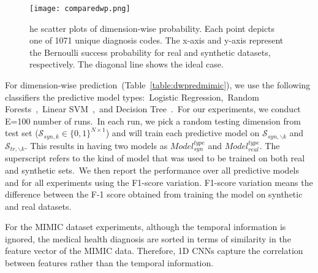\documentclass[letterpaper]{article} \usepackage{aaai20}  \usepackage{times}  \usepackage{helvet} \usepackage{courier}  \usepackage[hyphens]{url}  \usepackage{graphicx} \urlstyle{rm} \def\UrlFont{\rm}  \usepackage{graphicx}  \frenchspacing  \setlength{\pdfpagewidth}{8.5in}  \setlength{\pdfpageheight}{11in}
\begin{document}
\begin{figure*}
\centering
    \texttt{[image: comparedwp.png]}
    \caption[]{he scatter plots of dimension-wise probability. Each point depicts one of 1071 unique diagnosis codes. The x-axis and y-axis represent the Bernoulli success probability for real and synthetic datasets, respectively. The diagonal line shows the ideal case.} \label{fig:dwpmimic}
\end{figure*}

For dimension-wise prediction~(Table~\ref{table:dwpredmimic}), we use the following classifiers the predictive model types:~Logistic Regression,~Random Forests~\cite{breiman2001random},~Linear SVM~\cite{cortes1995support},~and Decision Tree~\cite{quinlan1986induction}.~For our experiments, we conduct E=100 number of runs.~In each run, we pick a random testing dimension from test set ($\mathcal{S}_{syn,k} \in \{0,1\}^{N \times 1}$) and will train each predictive model on $\mathcal{S}_{syn, \backslash k}$ and $\mathcal{S}_{tr, \backslash k}$. This results in having two models as $Model^{type}_{syn}$ and $Model^{type}_{real}$. The superscript refers to the kind of model that was used to be trained on both real and synthetic sets.~We then report the performance over all predictive models and for all experiments using the F1-score variation. F1-score variation means the difference between the F-1 score obtained from training the model on synthetic and real datasets. 

For the MIMIC dataset experiments, although the temporal information is ignored, the medical health diagnosis are sorted in terms of similarity in the feature vector of the MIMIC data. Therefore, 1D CNNs capture the correlation between features rather than the temporal information. 




\begin{table}[t]
\caption{Comparison of different baseline architectures. The reported metric demonstrate the mean and standard deviation of the F-1 score differences. A better model has a closer score to zero.}\smallskip
\centering
{}
\label{table:dwpredmimic}
\end{table}
\end{document}
